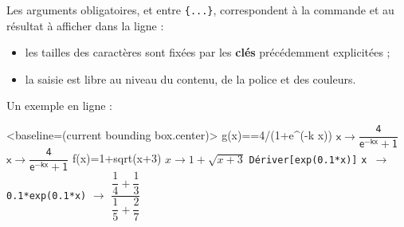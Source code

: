 \documentclass[french,a4paper,11pt]{article}
\newcommand\Cle[1]{{\bfseries\sffamily\textlangle #1\textrangle}}
\newcommand\cmaj[1]{\tcbox[vignetteMaJ]{#1}\xspace}
\begin{document}
\begin{tipblock}
Les arguments obligatoires, et entre \texttt{\{...\}}, correspondent à la commande et au résultat à afficher dans la ligne :

\begin{itemize}
	\item les tailles des caractères sont fixées par les \Cle{clés} précédemment explicitées ;
	\item la saisie est libre au niveau du contenu, de la police et des couleurs.
\end{itemize}
\end{tipblock}

\begin{PresentationCode}{}
Un exemple en ligne :~
\begin{CalculFormelXcas}%
		[Largeur=10,TexteOptions={Config : exact cpxl RAD 12 xcas}]%
		<baseline=(current bounding box.center)>
	\LigneCalculsXcas%
		{\sffamily g(x)==4/(1+e\textasciicircum(-k x))}
		{$\mathsf{x \rightarrow \dfrac{4}{e^{-kx}+1}}$}
		{$\mathsf{x \rightarrow \dfrac{4}{e^{-kx}+1}}$}
	\LigneCalculsXcas
		{f(x)=1+sqrt(x+3)}
		{$x \rightarrow 1+\sqrt{x+3}$}
	\LigneCalculsXcas
		{\texttt{Dériver[exp(0.1*x)]}}
		{\texttt{x $\rightarrow$ 0.1*exp(0.1*x)}}
		{$\rightarrow$ \: $\dfrac{\dfrac14+\dfrac13}{\dfrac15+\dfrac27}$}
	\end{CalculFormelXcas}
\end{PresentationCode}
%
%
\end{document}

